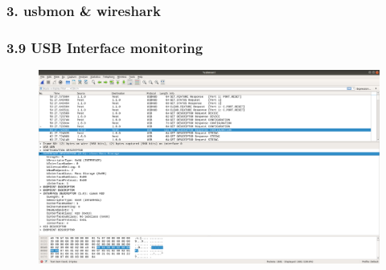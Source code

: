 \begin{frame}[fragile]
    \frametitle{3. usbmon \& wireshark}
	\frametitle{3.9 USB Interface monitoring}
    \begin{figure}
        \includegraphics[scale=0.18, angle=0, trim=0 0 0 0]{images/usbmon.png}
        \captionsetup{labelformat=empty,labelsep=none}
    \end{figure}
\end{frame}



